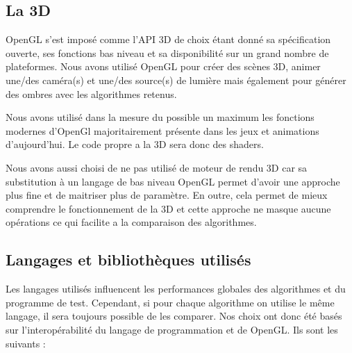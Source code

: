 \documentclass[a4paper,10pt]{report}
\begin{document}
\subsection{La 3D}

OpenGL s'est imposé comme l'API 3D de choix étant donné sa spécification ouverte, ses fonctions bas niveau et sa disponibilité sur un grand nombre de plateformes.
Nous avons utilisé OpenGL pour créer des scènes 3D, animer une/des caméra(s) et une/des source(s) de lumière mais également pour générer des ombres avec les algorithmes retenus.

Nous avons utilisé dans la mesure du possible un maximum les fonctions modernes d'OpenGl majoritairement présente dans les jeux et animations d'aujourd'hui. Le code propre a la 3D sera donc des shaders.

Nous avons aussi choisi de ne pas utilisé de moteur de rendu 3D car sa substitution à un langage de bas niveau OpenGL permet d'avoir une approche plus fine et de maitriser plus de paramètre. En outre, cela permet de mieux comprendre le fonctionnement de la 3D et cette approche ne masque aucune opérations ce qui facilite a la comparaison des algorithmes.

\subsection{Langages et bibliothèques utilisés}

Les langages utilisés influencent les performances globales des algorithmes et du programme de test. Cependant, si pour chaque algorithme on utilise le m\^eme langage, il sera toujours possible de les comparer. Nos choix ont donc été basés sur l'interopérabilité du langage de programmation et de OpenGL. Ils sont les suivants :
\end{document}
